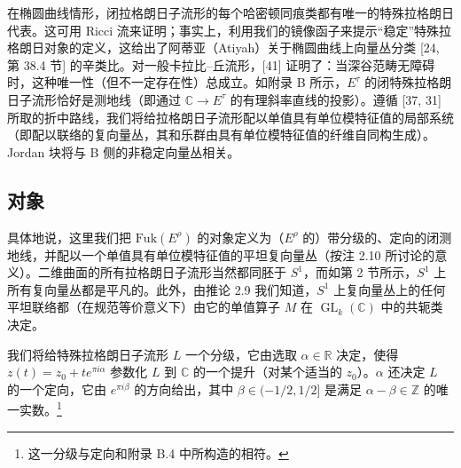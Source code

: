 \documentclass[11pt,a4paper]{article}
\theoremstyle{plain}
\theoremstyle{definition}
\begin{document}
在椭圆曲线情形，闭拉格朗日子流形的每个哈密顿同痕类都有唯一的特殊拉格朗日代表。这可用 Ricci 流来证明；事实上，利用我们的镜像函子来提示“稳定”特殊拉格朗日对象的定义，这给出了阿蒂亚（Atiyah）关于椭圆曲线上向量丛分类 [24, 第 38.4 节] 的辛类比。对一般卡拉比–丘流形，[41] 证明了：当深谷范畴无障碍时，这种唯一性（但不一定存在性）总成立。如附录 B 所示，$E^\tau$ 的闭特殊拉格朗日子流形恰好是测地线（即通过 $\mathbb{C}\to E^\tau$ 的有理斜率直线的投影）。遵循 [37, 31] 所取的折中路线，我们将给拉格朗日子流形配以单值具有单位模特征值的局部系统（即配以联络的复向量丛，其和乐群由具有单位模特征值的纤维自同构生成）。Jordan 块将与 B 侧的非稳定向量丛相关。

\subsection{对象}

具体地说，这里我们把 $\mathrm{Fuk}(E^\rho)$ 的对象定义为（$E^\rho$ 的）带分级的、定向的闭测地线，并配以一个单值具有单位模特征值的平坦复向量丛（按注 2.10 所讨论的意义）。二维曲面的所有拉格朗日子流形当然都同胚于 $S^1$，而如第 2 节所示，$S^1$ 上所有复向量丛都是平凡的。此外，由推论 2.9 我们知道，$S^1$ 上复向量丛上的任何平坦联络都（在规范等价意义下）由它的单值算子 $M$ 在 $\operatorname{GL}_k(\mathbb{C})$ 中的共轭类决定。

我们将给特殊拉格朗日子流形 $L$ 一个分级，它由选取 $\alpha\in\mathbb{R}$ 决定，使得 $z(t)=z_0+te^{\pi i\alpha}$ 参数化 $L$ 到 $\mathbb{C}$ 的一个提升（对某个适当的 $z_0$）。$\alpha$ 还决定 $L$ 的一个定向，它由 $e^{\pi i\beta}$ 的方向给出，其中 $\beta\in(-1/2,1/2]$ 是满足 $\alpha-\beta\in\mathbb{Z}$ 的唯一实数。\footnote{这一分级与定向和附录 B.4 中所构造的相符。}
\end{document}
